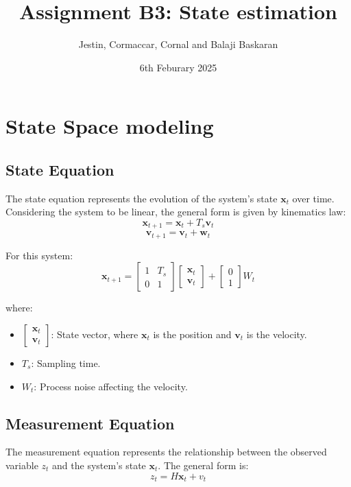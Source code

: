 \documentclass{article}
\title{Assignment B3: State estimation}
\author{Jestin, Cormaccar, Cornal and Balaji Baskaran}
\date{6th Feburary 2025}
\begin{document}
\maketitle

\section{State Space modeling}

\subsection*{State Equation}
The state equation represents the evolution of the system's state \( \mathbf{x}_t \) over time. Considering the system to be linear, the general form is given by kinematics law:
\[
\mathbf{x}_{t+1} = \mathbf{x}_t + T_s \mathbf{v}_{t}
\]
\[ \mathbf{v}_{t+1} = \mathbf{v}_{t} + \mathbf{w}_t\]

For this system:
\[
\mathbf{x}_{t+1} = 
\begin{bmatrix}
1 & T_s \\
0 & 1
\end{bmatrix} \begin{bmatrix}
   \mathbf{x}_t \\ \mathbf{v}_{t} 
\end{bmatrix}
 +
\begin{bmatrix}
0 \\
1
\end{bmatrix}
W_t
\]

where:
\begin{itemize}
    \item \( \begin{bmatrix} \mathbf{x}_t \\ \mathbf{v}_{t} \end{bmatrix} \): State vector, where \( \mathbf{x}_t \) is the position and \( \mathbf{v}_{t} \) is the velocity.
    \item \( T_s \): Sampling time.
    \item \( W_t \): Process noise affecting the velocity.
\end{itemize}

\subsection*{Measurement Equation}
The measurement equation represents the relationship between the observed variable \( z_t \) and the system's state \( \mathbf{x}_t \). The general form is:
\[
z_t = H \mathbf{x}_t + v_t
\]
\end{document}
